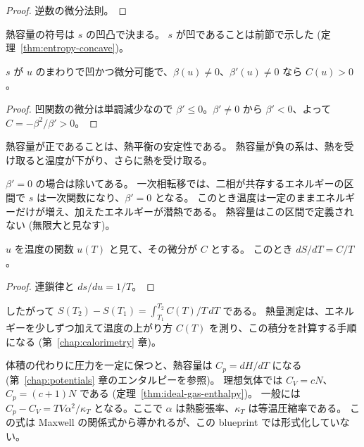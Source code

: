 \begin{proof}
  \leanok
  逆数の微分法則。
\end{proof}

熱容量の符号は $s$ の凹凸で決まる。
$s$ が凹であることは前節で示した (定理~\ref{thm:entropy-concave})。

\begin{theorem}[熱容量は正]
  \label{thm:heat-capacity-pos}
  \leanok
  $s$ が $u$ のまわりで凹かつ微分可能で、$\beta(u) \ne 0$、$\beta'(u) \ne 0$ なら $C(u) > 0$。
\end{theorem}

\begin{proof}
  \leanok
  凹関数の微分は単調減少なので $\beta' \le 0$。$\beta' \ne 0$ から $\beta' < 0$、よって $C = -\beta^2/\beta' > 0$。
\end{proof}

熱容量が正であることは、熱平衡の安定性である。
熱容量が負の系は、熱を受け取ると温度が下がり、さらに熱を受け取る。

$\beta' = 0$ の場合は除いてある。
一次相転移では、二相が共存するエネルギーの区間で $s$ は一次関数になり、$\beta' = 0$ となる。
このとき温度は一定のままエネルギーだけが増え、加えたエネルギーが潜熱である。
熱容量はこの区間で定義されない (無限大と見なす)。

\begin{theorem}[温度の関数としてのエントロピー]
  \label{thm:dS-dT}
  \leanok
  $u$ を温度の関数 $u(T)$ と見て、その微分が $C$ とする。
  このとき $dS/dT = C/T$。
\end{theorem}

\begin{proof}
  \leanok
  連鎖律と $ds/du = 1/T$。
\end{proof}

したがって $S(T_2) - S(T_1) = \int_{T_1}^{T_2} C(T)/T\, dT$ である。
熱量測定は、エネルギーを少しずつ加えて温度の上がり方 $C(T)$ を測り、この積分を計算する手順になる (第~\ref{chap:calorimetry} 章)。

体積の代わりに圧力を一定に保つと、熱容量は $C_p = dH/dT$ になる (第~\ref{chap:potentials} 章のエンタルピーを参照)。
理想気体では $C_V = cN$、$C_p = (c + 1)N$ である (定理~\ref{thm:ideal-gas-enthalpy})。
一般には $C_p - C_V = TV\alpha^2/\kappa_T$ となる。ここで $\alpha$ は熱膨張率、$\kappa_T$ は等温圧縮率である。
この式は Maxwell の関係式から導かれるが、この blueprint では形式化していない。

